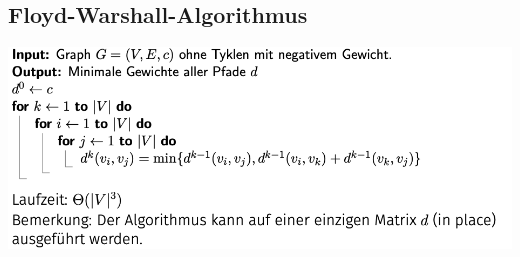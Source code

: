 \vspace{-4pt}
\begin{sectionbox}
\subsection{Floyd-Warshall-Algorithmus}
\begin{center}
    \includegraphics[width=\columnwidth]{img/FloydWarshall.png}
\end{center}
\end{sectionbox}
\vspace{-4pt}
